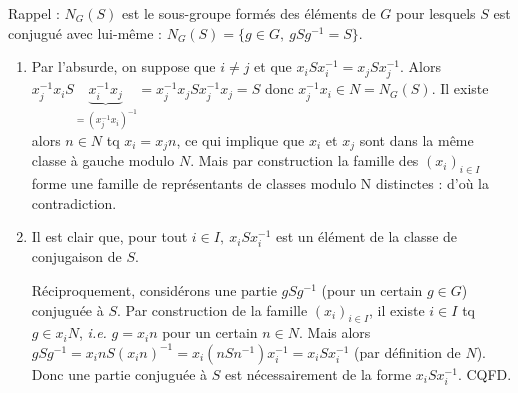 
Rappel : $N_G(S)$ est le sous-groupe formés des éléments de $G$ pour lesquels $S$ est conjugué avec lui-même :  $N_G(S) = \{g\in G,~ gSg^{-1} = S\}$.

\begin{enumerate}
 \item Par l'absurde, on suppose que $i\neq j$ et que $x_iSx_i^{-1} = x_jSx_j^{-1}$. Alors $x_j^{-1}x_iS\underbrace{x_i^{-1}x_j}_{=(x_j^{-1}x_i)^{-1}} = x_j^{-1}x_jSx_j^{-1}x_j = S$ donc $x_j^{-1}x_i \in N = N_G(S)$. Il existe alors $n\in N$ tq $x_i = x_jn$, ce qui implique que $x_i$ et $x_j$ sont dans la même classe à gauche modulo $N$. Mais par construction la famille des $(x_i)_{i\in I}$ forme une famille de représentants de classes modulo N distinctes : d'où la contradiction.

 \item Il est clair que, pour tout $i\in I,~ x_iSx_i^{-1}$ est un élément de la classe de conjugaison de $S$.

 Réciproquement, considérons une partie $gSg^{-1}$ (pour un certain $g \in G$) conjuguée à $S$. Par construction de la famille  $(x_i)_{i\in I}$, il existe $i\in I$ tq $g \in x_iN$, \emph{i.e.} $g = x_i n$ pour un certain $n\in N$. Mais alors $gSg^{-1} = x_i n S (x_i n)^{-1} = x_i \left(n Sn^{-1}\right) x_i^{-1} = x_i S x_i^{-1}$ (par définition de $N$). Donc une partie conjuguée à $S$ est nécessairement de la forme $x_i S x_i^{-1}$. CQFD.
\end{enumerate}
